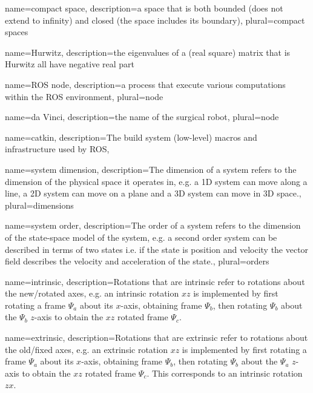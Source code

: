 {name={compact space},
 description={a space that is both bounded (does not extend to infinity) and closed (the space includes its boundary)},
 plural={compact spaces}
}

{name={Hurwitz},
 description={the eigenvalues of a (real square) matrix that is Hurwitz all have negative real part}
}

{name=ROS node,
 description={a process that execute various computations within the ROS environment},
 plural={node}
}


{name=da Vinci,
 description={the name of the surgical robot},
 plural={node}
}

{name=catkin,
 description={The build system (low-level) macros and infrastructure used by ROS},
}


{name={system dimension},
 description={The dimension of a system refers to the dimension of the physical space it operates in, e.g. a 1D system can move along a line, a 2D system can move on a plane and a 3D system can move in 3D space.},
 plural={dimensions}
}

{name={system order},
 description={The order of a system refers to the dimension of the state-space model of the system, e.g. a second order system can be described in terms of two states i.e. if the state is position and velocity the vector field describes the velocity and acceleration of the state.},
 plural={orders}
}

{name={intrinsic},
	description={Rotations that are intrinsic refer to rotations about the new/rotated axes, e.g. an intrinsic rotation $xz$ is implemented by first rotating a frame $\Psi_a$ about its $x$-axis, obtaining frame $\Psi_b$, then rotating $\Psi_b$ about the $\Psi_b$ $z$-axis to obtain the $xz$ rotated frame $\Psi_c$.}
}

{name={extrinsic},
	description={Rotations that are extrinsic refer to rotations about the old/fixed axes, e.g. an extrinsic rotation $xz$ is implemented by first rotating a frame $\Psi_a$ about its $x$-axis, obtaining frame $\Psi_b$, then rotating $\Psi_b$ about the $\Psi_a$ $z$-axis to obtain the $xz$ rotated frame $\Psi_c$. This corresponds to an intrinsic rotation $zx$.}
}

